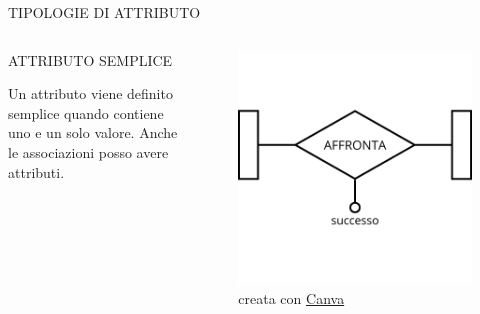 \documentclass[aspectratio=1610]{beamer}
\begin{document}
\begin{frame}{TIPOLOGIE DI ATTRIBUTO}
    \begin{columns}
            \begin{alertblock}{ATTRIBUTO SEMPLICE}
                \begin{minipage}{0.96\linewidth}
                    \justifying
                    Un attributo viene definito semplice quando contiene uno e un solo valore. 
                    Anche le associazioni posso avere attributi.\\
                    \bigskip
                \end{minipage}
            \end{alertblock}
            \begin{figure}
                \includegraphics[width=\linewidth]{img/attributo_associazione.png}
                \caption{{creata con \href{www.canva.com}{Canva}}}
            \end{figure}
    \end{columns}
\end{frame}
\end{document}
